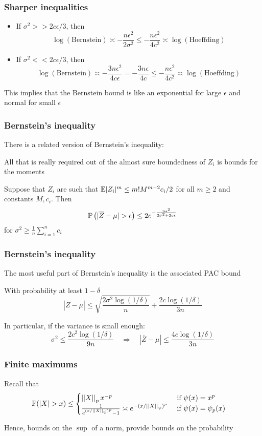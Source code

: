 \documentclass[12pt]{beamer}
\begin{document}
\begin{frame}[fragile]
\frametitle{Sharper inequalities}
\begin{itemize}
\item If $\sigma^2 >> 2c\epsilon/3$, then 
\[
\log(\textrm{Bernstein}) \asymp -\frac{n\epsilon^2}{2\sigma^2} \leq -\frac{n\epsilon^2}{4c^2}  \asymp \log(\textrm{Hoeffding})
\]
\item If $\sigma^2 << 2c\epsilon/3$, then 
\[
\log(\textrm{Bernstein}) \asymp -\frac{3n\epsilon^2}{4c\epsilon} =  -\frac{3n\epsilon}{4c} \leq -\frac{n\epsilon^2}{4c^2}  \asymp \log(\textrm{Hoeffding})
\]
\end{itemize}

  This implies that the Bernstein bound is like an exponential for large $\epsilon$
and normal for small $\epsilon$
\end{frame}

\begin{frame}[fragile]
\frametitle{Bernstein's inequality}
There is a related  version of Bernstein's inequality:

\vsp
All that is really required out of the almost sure boundedness of $Z_i$ is bounds for the moments

\vsp
Suppose that $Z_i$ are such that $\E|Z_i|^m \leq m!M^{m-2}c_i/2$ for all $m \geq 2$ and constants $M, c_i$.  Then
\[
\P\left( |\overline{Z} - \mu| > \epsilon\right) \leq 2e^{-\frac{n\epsilon^2}{2\sigma^2 + 2c\epsilon}}
\]
for $\sigma^2 \geq \frac{1}{n} \sum_{i=1}^n c_i$
\end{frame}

\begin{frame}[fragile]
\frametitle{Bernstein's inequality}
The most useful part of Bernstein's inequality is the associated PAC bound

\vsp
With probability at least $1-\delta$ 
\[
|\overline{Z} - \mu| \leq \sqrt{\frac{2\sigma^2\log(1/\delta)}{n}} + \frac{2c\log(1/\delta)}{3n}
\]

\vsp
In particular, if the variance is small enough:
\[
\sigma^2 \leq \frac{2c^2\log(1/\delta)}{9n}
\quad \Rightarrow \quad |\overline{Z} - \mu| \leq \frac{4c\log(1/\delta)}{3n}
\]
\end{frame}


\begin{frame}[fragile]
\frametitle{Finite maximums}
Recall that 
\begin{align*}
\P(|X| > x) 
& \leq
\begin{cases}
\norm{X}_px^{-p} & \textrm{ if } \psi(x) = x^p \\
\frac{1}{e^{(x/\norm{X}_{\psi})^p}-1}  \asymp e^{-(x/\norm{X}_{\psi})^{p}}&  \textrm{ if } \psi(x) = \psi_p(x)
\end{cases}
\end{align*}

Hence, bounds on the $\sup$ of a norm, provide bounds on the probability 
\end{frame}
\end{document}
